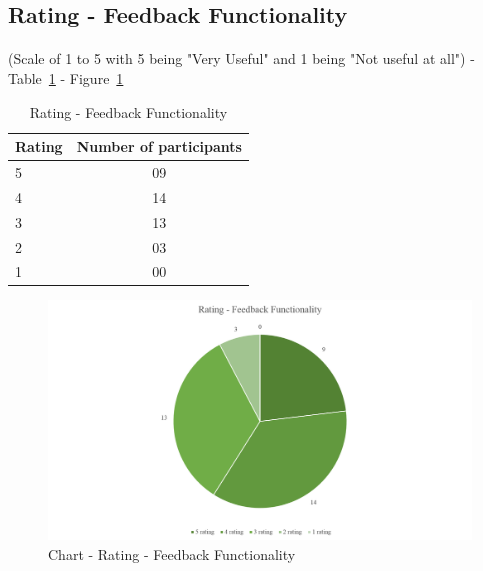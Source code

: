 \subsection{Rating - Feedback Functionality} 

\paragraph{} (Scale of 1 to 5 with 5 being "Very Useful" and 1 being "Not useful at all") - Table~\ref{table-survey-rating-FeedbackFunctionality} - Figure~\ref{image-ratingFeedbackFunctionality}

\begin{table} [H]
\centering
\begin{tabular}{|l|c|}
\hline
Rating & Number of participants \\
\hline
5	&09 \\
4	&14 \\
3	&13 \\
2	&03 \\
1	&00 \\
\hline
\end{tabular}
\caption{Rating - Feedback Functionality}
\label{table-survey-rating-FeedbackFunctionality}
\end{table}

\begin {figure} [H]
\centering
\includegraphics [scale=0.6] {ratingFeedbackFunctionality}
\caption [Chart - Rating - Feedback Functionality] {Chart - Rating - Feedback Functionality}
\label {image-ratingFeedbackFunctionality}
\end {figure}

